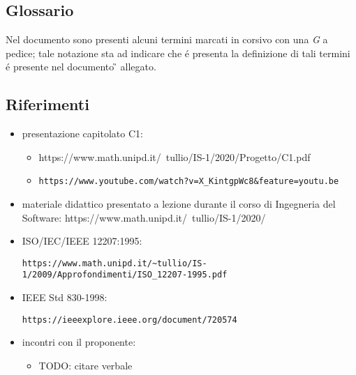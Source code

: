 \subsection{Glossario}
Nel documento sono presenti alcuni termini marcati in corsivo con una \emph{G} a pedice; tale notazione sta ad indicare che \'{e} presenta la definizione di tali termini \'{e} presente nel documento \G{} allegato.

\subsection{Riferimenti}
\begin{itemize}
    \item presentazione capitolato C1:
    \begin{itemize} 
        \item https://www.math.unipd.it/~tullio/IS-1/2020/Progetto/C1.pdf
        \item \begin{verbatim}https://www.youtube.com/watch?v=X_KintgpWc8&feature=youtu.be\end{verbatim}
    \end{itemize}
    \item materiale didattico presentato a lezione durante il corso di Ingegneria del Software: https://www.math.unipd.it/~tullio/IS-1/2020/
    \item ISO/IEC/IEEE 12207:1995: \begin{verbatim}https://www.math.unipd.it/~tullio/IS-1/2009/Approfondimenti/ISO_12207-1995.pdf\end{verbatim}
    \item IEEE Std 830-1998: \begin{verbatim}https://ieeexplore.ieee.org/document/720574\end{verbatim}
    \item incontri con il proponente: 
    \begin{itemize}
        \item TODO: citare verbale
    \end{itemize}
\end{itemize}